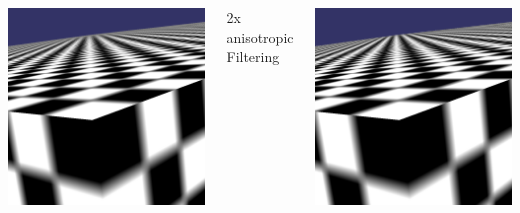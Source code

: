\documentclass[utf8,stillsansserifmath,fleqn,t]{beamer}
\begin{document}
\begin{frame}
\begin{columns}
\centerline{\includegraphics[width=\textwidth]{./fig/anisotropy-1.png}}
\centerline{2x anisotropic Filtering}
\centerline{\includegraphics[width=\textwidth]{./fig/anisotropy-2.png}}

\end{columns}
\end{frame}
\end{document}
